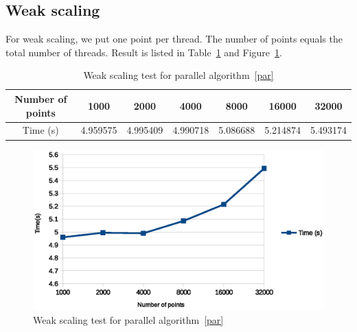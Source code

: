 \subsection{Weak scaling}
For weak scaling, we put one point per thread. The number of points equals the total number of threads.
Result is listed in Table~\ref{tab:weak-scaling} and Figure~\ref{fig:weak_scaling}.
\begin{table}[ht]
  \centering
  \begin{tabular}{|c|c|c|c|c|c|c|}
    \hline
    Number of points	& 1000	& 2000	& 4000	& 8000	& 16000	& 32000 \\
    \hline
    Time (s)	 &4.959575	&4.995409	&4.990718	&5.086688	&5.214874	&5.493174\\
    \hline
  \end{tabular}
  \label{tab:weak-scaling}
  \caption{Weak scaling test for parallel algorithm~\ref{par}}
\end{table}
\begin{figure}[!h]
  \centering
  \includegraphics[width=\linewidth]{fig/weak_scaling}
  \caption{Weak scaling test for parallel algorithm~\ref{par}}
  \label{fig:weak_scaling}
\end{figure}

